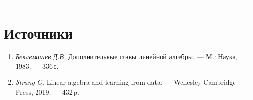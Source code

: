 \documentclass[11pt,a4paper]{article}
\providecommand{\tightlist}{%
  \setlength{\itemsep}{0pt}\setlength{\parskip}{0pt}}
\begin{document}
    \begin{center}\rule{0.5\linewidth}{0.5pt}\end{center}

    \hypertarget{ux438ux441ux442ux43eux447ux43dux438ux43aux438}{%
\section{Источники}\label{ux438ux441ux442ux43eux447ux43dux438ux43aux438}}

\begin{enumerate}
\def\labelenumi{\arabic{enumi}.}
\tightlist
\item
  \emph{Беклемишев Д.В.} Дополнительные главы линейной алгебры. --- М.:
  Наука, 1983. --- 336\,с.
\item
  \emph{Strang G.} Linear algebra and learning from data. ---
  Wellesley-Cambridge Press, 2019. --- 432\,p.

\end{enumerate}



\end{document}
